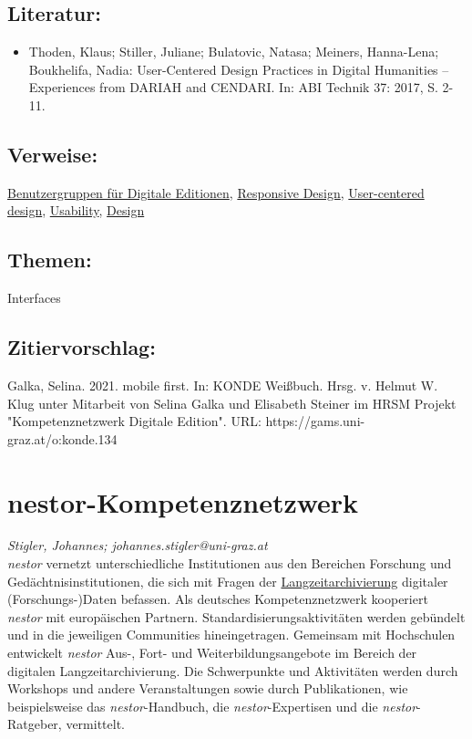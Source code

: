 \documentclass{article}
\begin{document}
        \subsection*{Literatur:}\begin{itemize}\item Thoden, Klaus; Stiller, Juliane; Bulatovic, Natasa; Meiners, Hanna-Lena; Boukhelifa, Nadia: User-Centered Design Practices in Digital Humanities – Experiences from DARIAH and CENDARI. In: ABI Technik 37: 2017, S. 2-11.\end{itemize}\subsection*{Verweise:}\href{https://gams.uni-graz.at/o:konde.148}{Benutzergruppen für Digitale Editionen}, \href{https://gams.uni-graz.at/o:konde.164}{Responsive Design}, \href{https://gams.uni-graz.at/o:konde.207}{User-centered design}, \href{https://gams.uni-graz.at/o:konde.205}{Usability}, \href{https://gams.uni-graz.at/o:konde.56}{Design}\subsection*{Themen:}Interfaces\subsection*{Zitiervorschlag:}Galka, Selina. 2021. mobile first. In: KONDE Weißbuch. Hrsg. v. Helmut W. Klug unter Mitarbeit von Selina Galka und Elisabeth Steiner im HRSM Projekt "Kompetenznetzwerk Digitale Edition". URL: https://gams.uni-graz.at/o:konde.134\newpage\section*{nestor-Kompetenznetzwerk} \emph{Stigler, Johannes; johannes.stigler@uni-graz.at }\\
        
    \emph{nestor} vernetzt unterschiedliche Institutionen aus den Bereichen Forschung und Gedächtnisinstitutionen, die sich mit Fragen der \href{http://gams.uni-graz.at/o:konde.6}{Langzeitarchivierung} digitaler (Forschungs-)Daten befassen. Als deutsches Kompetenznetzwerk kooperiert \emph{nestor} mit europäischen Partnern. Standardisierungsaktivitäten werden gebündelt und in die jeweiligen Communities hineingetragen. Gemeinsam mit Hochschulen entwickelt \emph{nestor} Aus-, Fort- und Weiterbildungsangebote im Bereich der digitalen Langzeitarchivierung. Die Schwerpunkte und Aktivitäten werden durch Workshops und andere Veranstaltungen sowie durch Publikationen, wie beispielsweise das \emph{nestor}-Handbuch, die \emph{nestor}-Expertisen und die \emph{nestor}-Ratgeber, vermittelt. \\
            
\end{document}
